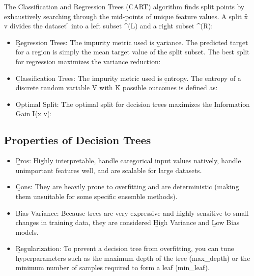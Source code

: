 The Classification and Regression Trees (CART) algorithm finds split points by exhaustively searching through the mid-points of unique feature values. A split \f{x \le v} divides the dataset \f{} into a left subset \f{^{(L)}} and a right subset \f{^{(R)}}:
\begin{itemize}
\item \b{Regression Trees}: The impurity metric used is \b{variance}. The predicted target for a region is simply the mean target value of the split subset. The best split for regression maximizes the variance reduction:
\item \b{Classification Trees}: The impurity metric used is \b{entropy}. The entropy of a discrete random variable \f{V} with \f{K} possible outcomes is defined as:
\item \b{Optimal Split}: The optimal split for decision trees maximizes the \b{Information Gain} \f{I(x \le v)}:
\end{itemize}




\subsection{Properties of Decision Trees}

\begin{itemize}
\item \b{Pros}: Highly interpretable, handle categorical input values natively, handle unimportant features well, and are scalable for large datasets.
\item \b{Cons}: They are heavily prone to overfitting and are deterministic (making them unsuitable for some specific ensemble methods).
\item \b{Bias-Variance}: Because trees are very expressive and highly sensitive to small changes in training data, they are considered \b{High Variance} and \b{Low Bias} models.
\item \b{Regularization}: To prevent a decision tree from overfitting, you can tune hyperparameters such as the maximum depth of the tree (max\_depth) or the minimum number of samples required to form a leaf (min\_leaf).
\end{itemize}
